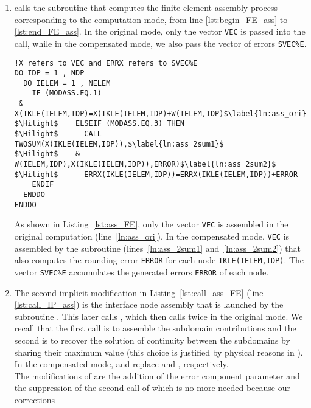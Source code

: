 \begin{enumerate}
\item  {} calls the subroutine  that computes
the finite element assembly process corresponding to the computation mode,
from line \ref{lst:begin_FE_ass} to \ref{lst:end_FE_ass}.
In the original mode, only the vector \texttt{VEC} is passed into the  call,
while in the compensated mode, we also pass the
vector of errors \texttt{SVEC\%E}.
%
\begin{lstlisting}[language=TelFortran,
caption={The FE assembly in \telfile{ASSVEC}},label={lst:ass_FE},escapechar=\$]
!X refers to VEC and ERRX refers to SVEC%E
DO IDP = 1 , NDP
  DO IELEM = 1 , NELEM
    IF (MODASS.EQ.1)
 &   X(IKLE(IELEM,IDP)=X(IKLE(IELEM,IDP)+W(IELEM,IDP)$\label{ln:ass_ori}$
$\Hilight$    ELSEIF (MODASS.EQ.3) THEN
$\Hilight$      CALL TWOSUM(X(IKLE(IELEM,IDP)),$\label{ln:ass_2sum1}$
$\Hilight$    &   W(IELEM,IDP),X(IKLE(IELEM,IDP)),ERROR)$\label{ln:ass_2sum2}$
$\Hilight$      ERRX(IKLE(IELEM,IDP))=ERRX(IKLE(IELEM,IDP))+ERROR
    ENDIF
  ENDDO
ENDDO
\end{lstlisting}
%
As shown in Listing~\ref{lst:ass_FE},
only the vector \texttt{VEC} is assembled in the original computation (line~\ref{ln:ass_ori}).
In the compensated mode, \texttt{VEC} is assembled by the
subroutine  (lines~\ref{ln:ass_2sum1} and~\ref{ln:ass_2sum2})
that also computes the rounding error \texttt{ERROR}
for each node \texttt{IKLE(IELEM,IDP)}. The vector \texttt{SVEC\%E} accumulates
the generated errors \texttt{ERROR} of each node.
%
\item \label{item:2IPmodif} The second implicit modification in Listing~\ref{lst:call_ass_FE} (line \ref{lst:call_IP_ass})
is the interface node assembly that is launched by the subroutine .
This later calls , which then calls  twice
in the original mode. We recall that the first call is to assemble
the subdomain contributions and the second is to recover the solution of continuity
between the subdomains by sharing their maximum value
(this choice is justified by physical reasons in \cite{Hervouet2007}). \\
%
In the compensated mode,
 and  replace
 and , respectively.\\
%
The modifications of  are the addition of the
error component parameter and  the suppression of the second call of
 which is no more needed because our corrections

\end{enumerate}
